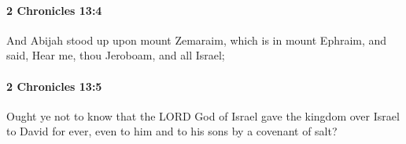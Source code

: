 		\paragraph{2 Chronicles 13:4} %
			\label{2CHRONICLES-13-4}

			And Abijah stood up upon mount Zemaraim, which is in mount Ephraim, and said, Hear me, thou Jeroboam, and all Israel;


		\paragraph{2 Chronicles 13:5} %
			\label{2CHRONICLES-13-5}

			Ought ye not to know that the LORD God of Israel gave the kingdom over Israel to David for ever, even to him and to his sons by a covenant of salt?


